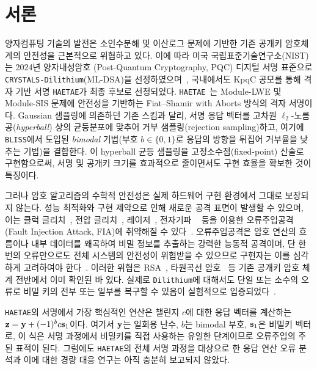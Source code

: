 \section{서론}
\label{sec:intro}

양자컴퓨팅 기술의 발전은 소인수분해 및 이산로그 문제에 기반한 기존 공개키 암호체계의 안전성을
근본적으로 위협하고 있다. 이에 따라 미국 국립표준기술연구소(NIST)는 2024년 양자내성암호
(Post-Quantum Cryptography, PQC) 디지털 서명 표준으로 \texttt{CRYSTALS-Dilithium}(ML-DSA)을
선정하였으며~\cite{dilithium,fips204,nist_pqc}, 국내에서도 KpqC 공모를 통해 격자 기반 서명
\texttt{HAETAE}가 최종 후보로 선정되었다. \texttt{HAETAE}~\cite{haetae}는 Module-LWE 및
Module-SIS 문제에 안전성을 기반하는 Fiat--Shamir with Aborts 방식의 격자 서명이다. Gaussian
샘플링에 의존하던 기존 스킴과 달리, 서명 응답 벡터를 고차원 $\ell_2$-노름 공(\emph{hyperball})
상의 균등분포에 맞추어 거부 샘플링(rejection sampling)하고, 여기에 \texttt{BLISS}에서 도입된
\emph{bimodal} 기법(부호 $b\in\{0,1\}$로 응답의 방향을 뒤집어 거부율을 낮추는 기법)을 결합한다.
이 hyperball 균등 샘플링을 고정소수점(fixed-point) 산술로 구현함으로써, 서명 및 공개키 크기를
효과적으로 줄이면서도 구현 효율을 확보한 것이 특징이다.

그러나 암호 알고리즘의 수학적 안전성은 실제 하드웨어 구현 환경에서 그대로 보장되지 않는다.
성능 최적화와 구현 제약으로 인해 새로운 공격 표면이 발생할 수 있으며, 이는 클럭
글리치~\cite{yang2020}, 전압 글리치~\cite{oflynn2016}, 레이저~\cite{skorobogatov2002}, 전자기파
~\cite{dumont2019} 등을 이용한 오류주입공격(Fault Injection Attack, FIA)에 취약해질 수
있다~\cite{boneh1997,barel2006,espitau2016}. 오류주입공격은 암호 연산의 흐름이나 내부 데이터를
왜곡하여 비밀 정보를 추출하는 강력한 능동적 공격이며, 단 한 번의 오류만으로도 전체 시스템의 안전성이
위협받을 수 있으므로 구현자는 이를 심각하게 고려하여야 한다~\cite{ravi2022survey}. 이러한 위협은
RSA~\cite{lenstra1996}, 타원곡선 암호~\cite{biehl2000,ciet2005} 등 기존 공개키 암호 체계 전반에서
이미 확인된 바 있다. 실제로 \texttt{Dilithium}에 대해서도 단일 또는 소수의 오류로 비밀 키의 전부
또는 일부를 복구할 수 있음이 실험적으로 입증되었다~\cite{ravi2019determinism,krahmer2024,elghamrawy2023}.

\texttt{HAETAE}의 서명에서 가장 핵심적인 연산은 챌린지 $c$에 대한 응답 벡터를 계산하는
$\mathbf{z}=\mathbf{y}+(-1)^b c\mathbf{s}_1$이다. 여기서 $\mathbf{y}$는 일회용 난수, $b$는 bimodal 부호, $\mathbf{s}_1$은
비밀키 벡터로, 이 식은 서명 과정에서 비밀키를 직접 사용하는 유일한 단계이므로 오류주입의 주된
표적이 된다. 그럼에도 \texttt{HAETAE}의 전체 서명 과정을 대상으로 한 응답 연산 오류 분석과 이에
대한 경량 대응 연구는 아직 충분히 보고되지 않았다.

